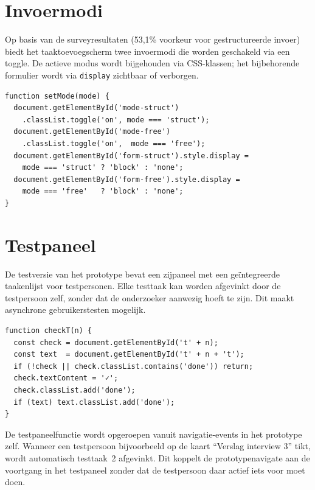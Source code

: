 \section{Invoermodi}

Op basis van de surveyresultaten (53,1\% voorkeur voor gestructureerde invoer)
biedt het taaktoevoegscherm twee invoermodi die worden geschakeld via een
toggle. De actieve modus wordt bijgehouden via CSS-klassen; het bijbehorende
formulier wordt via \texttt{display} zichtbaar of verborgen.

\begin{listing}[ht]
\caption[Invoermodi]{Toggle-functie voor de twee invoermodi in het
taaktoevoegscherm.}
\label{lst:invoer}
\begin{verbatim}
function setMode(mode) {
  document.getElementById('mode-struct')
    .classList.toggle('on', mode === 'struct');
  document.getElementById('mode-free')
    .classList.toggle('on',  mode === 'free');
  document.getElementById('form-struct').style.display =
    mode === 'struct' ? 'block' : 'none';
  document.getElementById('form-free').style.display =
    mode === 'free'   ? 'block' : 'none';
}
\end{verbatim}
\end{listing}

\section{Testpaneel}

De testversie van het prototype bevat een zijpaneel met een geïntegreerde
taakenlijst voor testpersonen. Elke testtaak kan worden afgevinkt door de
testpersoon zelf, zonder dat de onderzoeker aanwezig hoeft te zijn. Dit maakt
asynchrone gebruikerstesten mogelijk.

\begin{listing}[ht]
\caption[Testpaneel]{Functie die een testtaak in het zijpaneel afvinkt wanneer
de bijbehorende actie in het prototype wordt uitgevoerd.}
\label{lst:testpaneel}
\begin{verbatim}
function checkT(n) {
  const check = document.getElementById('t' + n);
  const text  = document.getElementById('t' + n + 't');
  if (!check || check.classList.contains('done')) return;
  check.textContent = '✓';
  check.classList.add('done');
  if (text) text.classList.add('done');
}
\end{verbatim}
\end{listing}

De testpaneelfunctie wordt opgeroepen vanuit navigatie-events in het prototype
zelf. Wanneer een testpersoon bijvoorbeeld op de kaart ``Verslag interview 3''
tikt, wordt automatisch testtaak~2 afgevinkt. Dit koppelt de prototypenavigate
aan de voortgang in het testpaneel zonder dat de testpersoon daar actief iets
voor moet doen.

